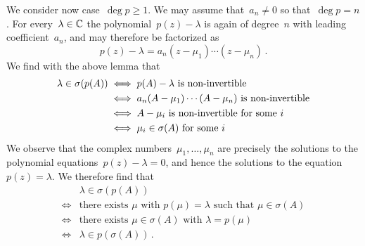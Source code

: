 We consider now case~$\deg p \geq 1$.
We may assume that~$a_n \neq 0$ so that~$\deg p = n$.
For every~$\lambda \in \mathbb{C}$ the polynomial~$p(z) - \lambda$ is again of degree~$n$ with leading coefficient~$a_n$, and may therefore be factorized as
\[
  p(z) - \lambda
  =
  a_n (z - \mu_1) \dotsm (z - \mu_n) \,.
\]
We find with the above lemma that
\begin{align*}
  \lambda \in \sigma(p(A))
  &\iff
  \text{$p(A) - \lambda$ is \dash{non}{invertible}}
  \\
  &\iff
  \text{$a_n (A - \mu_1) \dotsm (A - \mu_n)$ is \dash{non}{invertible}}
  \\
  &\iff
  \text{$A - \mu_i$ is \dash{non}{invertible} for some~$i$}
  \\
  &\iff
  \text{$\mu_i \in \sigma(A)$ for some~$i$}
\end{align*}
We observe that the complex numbers~$\mu_1, \dotsc, \mu_n$ are precisely the solutions to the polynomial equations~$p(z) - \lambda = 0$, and hence the solutions to the equation~$p(z) = \lambda$.
We therefore find that
\begin{align*}
  {}&
  \lambda \in \sigma(p(A))
  \\
  \iff{}&
  \text{there exists~$\mu$ with~$p(\mu) = \lambda$ such that~$\mu \in \sigma(A)$}
  \\
  \iff{}&
  \text{there exists~$\mu \in \sigma(A)$ with~$\lambda = p(\mu)$}
  \\
  \iff{}&
  \lambda \in p(\sigma(A))  \,.
\end{align*}



